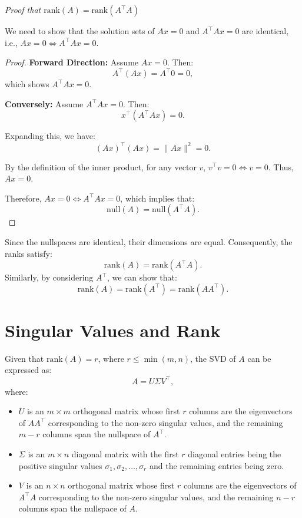 \documentclass{article}
\begin{document}
\textit{Proof that \( \text{rank}(A) = \text{rank}(A^\top A) \)}

We need to show that the solution sets of \( A x = 0 \) and \( A^\top A x = 0 \) are identical, i.e., \( A x = 0 \iff A^\top A x = 0 \).

\begin{proof}
\textbf{Forward Direction:} Assume \( A x = 0 \). Then:
\[
A^\top (A x) = A^\top 0 = 0,
\]
which shows \( A^\top A x = 0 \).

\textbf{Conversely:} Assume \( A^\top A x = 0 \). Then:
\[
x^\top (A^\top A x) = 0.
\]

Expanding this, we have:
\[
(A x)^\top (A x) = \| A x \|^2 = 0.
\]

By the definition of the inner product, for any vector \( v \), \( v^\top v = 0 \iff v = 0 \). Thus, \( A x = 0 \).

Therefore, \( A x = 0 \iff A^\top A x = 0 \), which implies that:
\[
\text{null}(A) = \text{null}(A^\top A).
\]
\end{proof}

Since the nullspaces are identical, their dimensions are equal. Consequently, the ranks satisfy:
\[
\text{rank}(A) = \text{rank}(A^\top A).
\]
Similarly, by considering \( A^\top \), we can show that:
\[
\text{rank}(A) = \text{rank}(A^\top) = \text{rank}(A A^\top).
\]

\section{Singular Values and Rank}

Given that \( \text{rank}(A) = r \), where \( r \leq \min(m, n) \), the SVD of \( A \) can be expressed as:
\[
A = U \Sigma V^\top,
\]
where:
\begin{itemize}
    \item \( U \) is an \( m \times m \) orthogonal matrix whose first \( r \) columns are the eigenvectors of \( A A^\top \) corresponding to the non-zero singular values, and the remaining \( m - r \) columns span the nullspace of \( A^\top \).
    \item \( \Sigma \) is an \( m \times n \) diagonal matrix with the first \( r \) diagonal entries being the positive singular values \( \sigma_1, \sigma_2, \dots, \sigma_r \) and the remaining entries being zero.
    \item \( V \) is an \( n \times n \) orthogonal matrix whose first \( r \) columns are the eigenvectors of \( A^\top A \) corresponding to the non-zero singular values, and the remaining \( n - r \) columns span the nullspace of \( A \).
\end{itemize}
\end{document}
